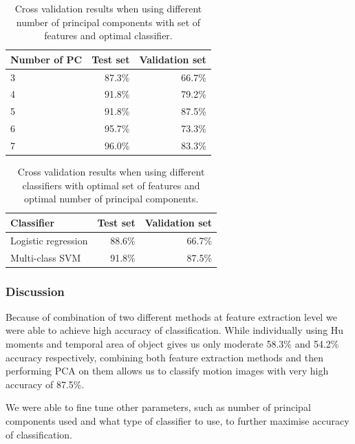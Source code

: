 \begin{table}
\begin{center}
\begin{tabular}{| l | r | r |}
\hline
Number of PC & Test set & Validation set \\ \hline
3 & 87.3\% & 66.7\% \\
4 & 91.8\% & 79.2\% \\
5 & 91.8\% & 87.5\% \\
6 & 95.7\% & 73.3\% \\
7 & 96.0\% & 83.3\% \\
\hline
\end{tabular}
\end{center}
\caption{Cross validation results when using different number of principal components with set of features and optimal classifier.}
\label{tab:pca}
\end{table}

\begin{table}
\begin{center}
\begin{tabular}{| l | r | r |}
\hline
Classifier & Test set & Validation set \\ \hline
Logistic regression & 88.6\% & 66.7\% \\
Multi-class SVM & 91.8\% & 87.5\% \\
\hline
\end{tabular}
\end{center}
\caption{Cross validation results when using different classifiers with optimal set of features and optimal number of principal components.}
\label{tab:classify}
\end{table}


\subsubsection*{Discussion}

Because of combination of two different methods at feature extraction level we were able to achieve high accuracy of classification. While individually using Hu moments and temporal area of object gives us only moderate 58.3\% and 54.2\% accuracy respectively, combining both feature extraction methods and then performing PCA on them allows us to classify motion images with very high accuracy of 87.5\%. 

We were able to fine tune other parameters, such as number of principal components used and what type of classifier to use, to further maximise accuracy of classification.